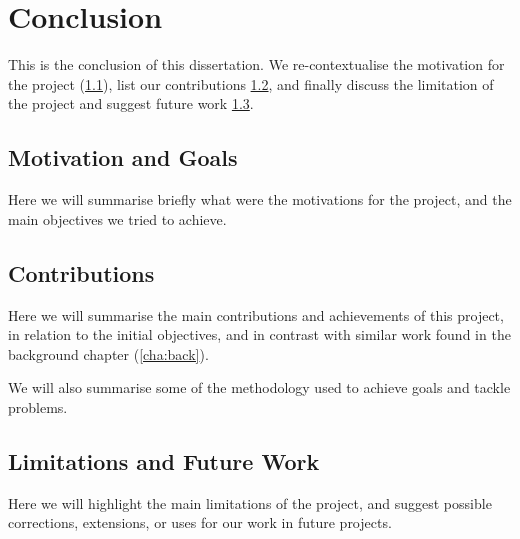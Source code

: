 \chapter{Conclusion}
\label{cha:concl}

This is the conclusion of this dissertation. We re-contextualise the motivation for the project (\cref{sec:concl_motiv}), list our contributions \cref{sec:concl_contrib}, and finally discuss the limitation of the project and suggest future work \cref{sec:concl_limit}.

\section{Motivation and Goals}
\label{sec:concl_motiv}

Here we will summarise briefly what were the motivations for the project, and the main objectives we tried to achieve.

\section{Contributions}
\label{sec:concl_contrib}

Here we will summarise the main contributions and achievements of this project, in relation to the initial objectives, and in contrast with similar work found in the background chapter (\cref{cha:back}).

We will also summarise some of the methodology used to achieve goals and tackle problems.

\section{Limitations and Future Work}
\label{sec:concl_limit}

Here we will highlight the main limitations of the project, and suggest possible corrections, extensions, or uses for our work in future projects.